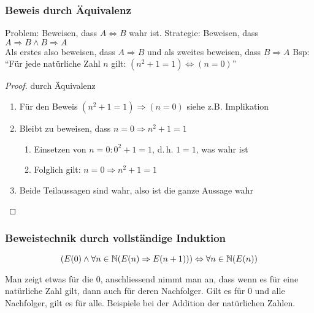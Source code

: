 \subsubsection{Beweis durch Äquivalenz}
Problem: Beweisen, dass $A \Leftrightarrow B$ wahr ist.
Strategie: Beweisen, dass $A \Rightarrow B \wedge B \Rightarrow A$\\
Als erstes also beweisen, dass $A \Rightarrow B$ und als zweites
beweisen, dass $B \Rightarrow A$
Bsp: \enquote{Für jede natürliche Zahl $n$ gilt: $(n^2 + 1 = 1) \Leftrightarrow (n = 0)$}\\
\begin{proof}
	durch Äquivalenz
\begin{enumerate}\itemsep0em
	\item Für den Beweis $(n^2 + 1 = 1) \Rightarrow (n = 0)$ siehe z.B. Implikation
	\item Bleibt zu beweisen, dass $n = 0 \Rightarrow n^2 + 1 = 1$
	\begin{enumerate}\itemsep0em
		\item Einsetzen von $n = 0: 0^2 + 1 = 1$, d.\,h. $1 = 1$, was wahr ist
		\item Folglich gilt: $n = 0 \Rightarrow n^2 + 1 = 1$ 
	\end{enumerate}
	\item Beide Teilaussagen sind wahr, also ist die ganze Aussage wahr\qedhere
\end{enumerate}
\end{proof}

\subsubsection{Beweistechnik durch vollständige Induktion}
\begin{equation*}
(E(0)
\wedge \forall n \in \mathbb{N} (E(n) \Rightarrow E(n + 1)))
\Leftrightarrow \forall n \in \mathbb{N} (E(n))
\end{equation*}

Man zeigt etwas für die 0, anschliessend nimmt man an, dass wenn es für eine
natürliche Zahl gilt, dann auch für deren Nachfolger. Gilt es für 0 und alle Nachfolger, gilt es für alle.
Beispiele bei der Addition der natürlichen Zahlen.